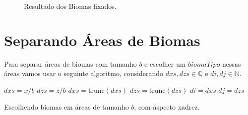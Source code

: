 \begin{figure}[H]
     \caption{Resultado dos Biomas fixados.}
     
     \label{fig:bssComBiomasFixados}
\end{figure}

\section{Separando Áreas de Biomas}
Para separar áreas de biomas com tamanho $b$ e escolher um $biomaTipo$ nessas áreas
vamos usar o seguinte algoritmo, considerando $dxs, dzs \in \mathbb{Q}$ e $di, dj \in \mathbb{N}$.

\begin{algorithm}[H]\label{alg:getBiomeXZXadrez}
    $dxs = x/b$\;
    $dzs = z/b$\;
    $dxs = $trunc$(dxs)$\;
    $dzs = $trunc$(dzs)$\;
    $di = dxs$\;
    $dj = dzs$\;
    
    
    \caption{Escolhendo biomas em áreas de tamanho $b$, com áspecto xadrez.}
\end{algorithm}

